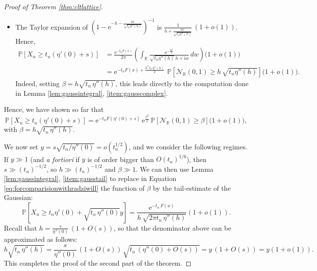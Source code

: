\documentclass[12pt,a4paper,reqno]{amsart}
\theoremstyle{remark}
\newcommand{\R}{\mathbb{R}}
\newcommand{\E}{\mathrm{e}}
\newcommand{\I}{\mathrm{i}}
\newcommand{\proba}{\mathbb{P}}
\begin{document}
\begin{proof}[Proof of Theorem \ref{thm:cltlattice}]
\begin{itemize}
so $t_{n}\,\Delta_n(w)$ is bounded by a $O(t_{n}\,\delta^{3})$, which is a $o(1)$ since $\delta\ll(t_{n})^{-1/3}$. So again one can replace $\E^{t_{n}\Delta_n(w)}$ by the constant $1$.\vspace{2mm}
\item The Taylor expansion of $\left(1-\E^{-h-\frac{\I w}{\sqrt{t_{n}\eta''(h)}}}\right)^{-1}$ is $\frac{1}{h+\frac{\I w}{\sqrt{t_{n}\eta''(h)}}}\,(1+o(1))$. Hence,
\begin{align*}\proba\left[X_{n}\geq t_{n}(\eta'(0)+s)\right]&= \frac{\E^{-t_{n}F(x)}}{2\pi} \left(\int_{\R} \frac{\E^{-\frac{w^{2}}{2}}}{\sqrt{t_{n}\eta''(h)} \,h+\I w} \,dw\right)\big(1+o(1)\big)\\
&=\E^{-t_{n}F(x)+\frac{h^{2}\,t_{n}\,\eta''(h)}{2}}\,\,\proba\!\left[\mathcal{N}_{\R}(0,1)\geq h\,\sqrt{t_{n}\eta''(h)}\right]\big(1+o(1)\big).
\end{align*}
Indeed, setting $\beta=h\sqrt{t_{n}\,\eta''(h)}$, this leads directly to the computation done in Lemma \ref{lem:gaussintegral}, \eqref{item:gausscomplex}.
\end{itemize}
Hence, we have shown so far that
\begin{equation}
\proba\left[X_{n}\geq t_{n}(\eta'(0)+s)\right]=\E^{-t_{n}F(\eta'(0)+s)}\,\E^{\frac{\beta^{2}}{2}}\,\proba[\mathcal{N}_{\R}(0,1)\geq \beta]\big(1+o(1)\big),\label{eq:forcomparisionwithradziwill}
\end{equation}
with $\beta=h\sqrt{t_{n}\,\eta''(h)}$.
\medskip

We now set $y=s\sqrt{t_{n}/\eta''(0)}=o(t_n^{1/2})$, and we consider the following regimes. If $y \gg 1$ (and \emph{a fortiori} if $y$ is of order bigger than $O(t_n)^{1/6}$), then  $s\gg (t_n)^{-1/2}$, so $h \gg (t_n)^{-1/2}$ and $\beta \gg 1$. We can then use Lemma \ref{lem:gaussintegral}, \eqref{item:gausstail} to replace in Equation \eqref{eq:forcomparisionwithradziwill} the function of $\beta$ by the tail-estimate of the Gaussian:
\begin{equation}
    \proba\left[X_n \geq t_n\eta'(0) + \sqrt{t_n\,\eta''(0)}y\right] 
= \frac{\E^{-t_n\,F(x)}}{h\,\sqrt{2\pi t_n\, \eta''(h)}}(1+o(1)).
\label{EqGaussianTail}
\end{equation}
Recall that $h=\frac{s}{\eta''(0)}\,(1+O(s))$, so that the denominator above can be approximated as follows:
\[h \sqrt{t_n\, \eta''(h)} =\frac{s}{\eta''(0)}\,(1+O(s))\, \sqrt{t_{n}\,(\eta''(0)+O(s))}= y\,(1+O(s))=y(1+o(1)).\]
This completes the proof of the second part of the theorem.
\medskip


\end{proof}
\end{document}
